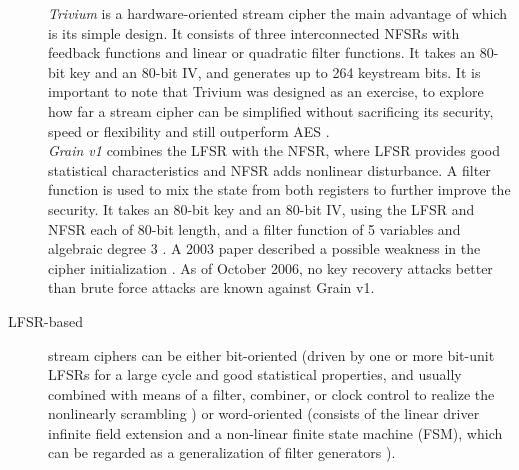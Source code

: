 \begin{description}
	\emph{Trivium} is a hardware-oriented stream cipher the main advantage of which is its simple design. It consists of three interconnected NFSRs with feedback functions and linear or quadratic filter functions. It takes an 80-bit key and an 80-bit IV, and generates up to 264 keystream bits. It is important to note that Trivium was designed as an exercise, to explore how far a stream cipher can be simplified without sacrificing its security, speed or flexibility and still outperform AES \cite{canniere2008trivium}.\\
	\emph{Grain v1} combines the LFSR with the NFSR, where LFSR provides good statistical characteristics and NFSR adds nonlinear disturbance. A filter function is used to mix the state from both registers to further improve the security. It takes an 80-bit key and an 80-bit IV, using the LFSR and NFSR each of 80-bit length, and a filter function of 5 variables and algebraic degree 3 \cite{hell2007grain}. A 2003 paper described a possible weakness in the cipher initialization \cite{kuccuk2006slide}. As of October 2006, no key recovery attacks better than brute force attacks are known against Grain v1.
	
	\item [LFSR-based] stream ciphers can be either bit-oriented (driven by one or more bit-unit LFSRs for a large cycle and good statistical properties, and usually combined with means of a filter, combiner, or clock control to realize the nonlinearly scrambling \cite{jiao2020stream}) or word-oriented (consists of the linear driver infinite field extension and a non-linear finite state machine (FSM), which can be regarded as a generalization of filter generators \cite{jiao2020stream}).
	
	\begin{figure}[h]
		

\end{figure}
\end{description}
